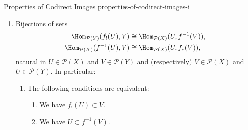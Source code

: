 \begin{proposition}{Properties of Codirect Images \rmI}{properties-of-codirect-images-i}
\begin{enumerate}
\begin{enumerate}
\[\begin{aligned}
                        \end{aligned}
                        \qquad
                        \begin{aligned}
                            \id_{\mathcal{P}(Y)} &\hookrightarrow f_{*}\circ f^{-1},\\
                            f^{-1}\circ f_{*}    &\hookrightarrow \id_{\mathcal{P}(X)},
                        \end{aligned}
                    \]%
                    having components of the form
                    \[
                        \begin{gathered}
                            U                \subset f^{-1}(f_{!}(U)),\\
                            f_{!}(f^{-1}(V)) \subset V,
                        \end{gathered}
                        \qquad
                        \begin{gathered}
                            V                \subset f_{*}(f^{-1}(V)),\\
                            f^{-1}(f_{*}(U)) \subset U
                        \end{gathered}
                    \]%
                    indexed by $U\in\mathcal{P}(X)$ and $V\in\mathcal{P}(Y)$.
                \item\label{properties-of-codirect-images-i-triple-adjointness-2}Bijections of sets
                    \begin{align*}
                        \Hom_{\mathcal{P}(Y)}(f_{!}(U),V)  &\cong \Hom_{\mathcal{P}(X)}(U,f^{-1}(V)),\\
                        \Hom_{\mathcal{P}(X)}(f^{-1}(U),V) &\cong \Hom_{\mathcal{P}(X)}(U,f_{*}(V)),
                    \end{align*}
                    natural in $U\in\mathcal{P}(X)$ and $V\in\mathcal{P}(Y)$ and (respectively) $V\in\mathcal{P}(X)$ and $U\in\mathcal{P}(Y)$. In particular:
                    \begin{enumerate}
                        \item\label{properties-of-codirect-images-i-triple-adjointness-2-a}The following conditions are equivalent:
                            \begin{enumerate}
                                \item\label{properties-of-codirect-images-i-triple-adjointness-2-a-i}We have $f_{!}(U)\subset V$.
                                \item\label{properties-of-codirect-images-i-triple-adjointness-2-a-ii}We have $U\subset f^{-1}(V)$.

\end{enumerate}
\end{enumerate}
\end{enumerate}
\end{enumerate}
\end{proposition}
